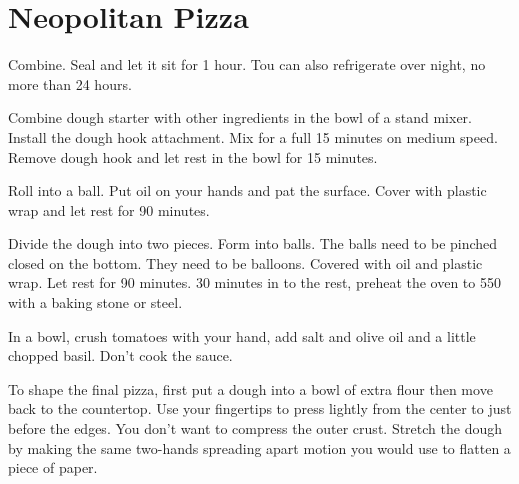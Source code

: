 \section{Neopolitan Pizza}
\begin{recipe}



Combine. Seal and let it sit for 1 hour. Tou can also refrigerate over night, no more than 24 hours. 


Combine dough starter with other ingredients in the bowl of a stand mixer. Install the dough hook attachment. Mix for a full 15 minutes on medium speed. Remove dough hook and let rest in the bowl for 15 minutes. 

Roll into a ball. Put oil on your hands and pat the surface. Cover with plastic wrap and let rest for 90 minutes. 

Divide the dough into two pieces. Form into balls. The balls need to be pinched closed on the bottom. They need to be balloons. Covered with oil and plastic wrap. Let rest for 90 minutes. 30 minutes in to the rest, preheat the oven to 550\degree{} with a baking stone or steel. 


In a bowl, crush tomatoes with your hand, add salt and olive oil and a little chopped basil. Don't cook the sauce.

To shape the final pizza, first put a dough into a bowl of extra flour then move back to the countertop. 
Use your fingertips to press lightly from the center to just before the edges. You don't want to compress the outer crust.
Stretch the dough by making the same two-hands spreading apart motion you would use to flatten a piece of paper. 


\end{recipe}
